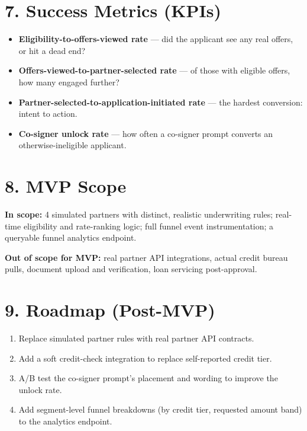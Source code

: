 \documentclass[10pt]{article}
\begin{document}
\section*{7. Success Metrics (KPIs)}
\begin{itemize}[leftmargin=18pt, itemsep=3pt]
\item \textbf{Eligibility-to-offers-viewed rate} --- did the applicant see any real offers, or hit a dead end?
\item \textbf{Offers-viewed-to-partner-selected rate} --- of those with eligible offers, how many engaged further?
\item \textbf{Partner-selected-to-application-initiated rate} --- the hardest conversion: intent to action.
\item \textbf{Co-signer unlock rate} --- how often a co-signer prompt converts an otherwise-ineligible applicant.
\end{itemize}

\section*{8. MVP Scope}
\textbf{In scope:} 4 simulated partners with distinct, realistic underwriting rules; real-time eligibility and rate-ranking logic; full funnel event instrumentation; a queryable funnel analytics endpoint.

\textbf{Out of scope for MVP:} real partner API integrations, actual credit bureau pulls, document upload and verification, loan servicing post-approval.

\section*{9. Roadmap (Post-MVP)}
\begin{enumerate}[leftmargin=18pt, itemsep=2pt]
\item Replace simulated partner rules with real partner API contracts.
\item Add a soft credit-check integration to replace self-reported credit tier.
\item A/B test the co-signer prompt's placement and wording to improve the unlock rate.
\item Add segment-level funnel breakdowns (by credit tier, requested amount band) to the analytics endpoint.
\end{enumerate}
\end{document}

